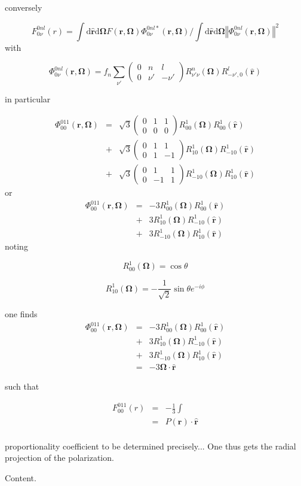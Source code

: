 conversely

\[
F_{0\nu}^{0nl}(r)=\int\mathrm{d}\hat{\mathbf{r}}\mathrm{d}\mathbf{\Omega}F(\mathbf{r},\mathbf{\Omega})\Phi_{0\nu}^{0nl*}(\mathbf{r},\mathbf{\Omega})/\int\mathrm{d}\hat{\mathbf{r}}\mathrm{d}\mathbf{\Omega}\left\Vert \Phi_{0\nu}^{0nl}(\mathbf{r},\mathbf{\Omega})\right\Vert ^{2}
\]
with

\[
\Phi_{0\nu}^{0nl}(\mathbf{r},\mathbf{\Omega})=f_{n}\sum_{\nu'}\left(\begin{array}{ccc}
0 & n & l\\
0 & \nu' & -\nu'
\end{array}\right)R_{\nu'\nu}^{n}(\mathbf{\Omega})R_{-\nu',0}^{l}(\mathbf{\hat{r}})
\]


in particular

\begin{eqnarray*}
\Phi_{00}^{011}(\mathbf{r},\mathbf{\Omega}) & = & \sqrt{3}\left(\begin{array}{ccc}
0 & 1 & 1\\
0 & 0 & 0
\end{array}\right)R_{00}^{1}(\mathbf{\Omega})R_{00}^{1}(\mathbf{\hat{r}})\\
 & + & \sqrt{3}\left(\begin{array}{ccc}
0 & 1 & 1\\
0 & 1 & -1
\end{array}\right)R_{10}^{1}(\mathbf{\Omega})R_{-10}^{1}(\mathbf{\hat{r}})\\
 & + & \sqrt{3}\left(\begin{array}{ccc}
0 & 1 & 1\\
0 & -1 & 1
\end{array}\right)R_{-10}^{1}(\mathbf{\Omega})R_{10}^{1}(\mathbf{\hat{r}})
\end{eqnarray*}
or
\begin{eqnarray*}
\Phi_{00}^{011}(\mathbf{r},\mathbf{\Omega}) & = & -3R_{00}^{1}(\mathbf{\Omega})R_{00}^{1}(\mathbf{\hat{r}})\\
 & + & 3R_{10}^{1}(\mathbf{\Omega})R_{-10}^{1}(\mathbf{\hat{r}})\\
 & + & 3R_{-10}^{1}(\mathbf{\Omega})R_{10}^{1}(\mathbf{\hat{r}})
\end{eqnarray*}
noting 

\[
R_{00}^{1}(\mathbf{\Omega})=\cos\theta
\]


\[
R_{10}^{1}(\mathbf{\Omega})=-\frac{1}{\sqrt{2}}\sin\theta e^{-i\phi}
\]


one finds
\begin{eqnarray*}
\Phi_{00}^{011}(\mathbf{r},\mathbf{\Omega}) & = & -3R_{00}^{1}(\mathbf{\Omega})R_{00}^{1}(\mathbf{\hat{r}})\\
 & + & 3R_{10}^{1}(\mathbf{\Omega})R_{-10}^{1}(\mathbf{\hat{r}})\\
 & + & 3R_{-10}^{1}(\mathbf{\Omega})R_{10}^{1}(\mathbf{\hat{r}})\\
 & = & -3\mathbf{\Omega}\cdot\hat{\mathbf{r}}
\end{eqnarray*}


such that

\begin{eqnarray*}
F_{00}^{011}(r) & = & -\frac{1}{3}\int\\
 & = & P(\mathbf{r})\cdot\hat{\mathbf{r}}\\
\end{eqnarray*}


proportionality coefficient to be determined precisely... One thus
gets the radial projection of the polarization.

Content.
